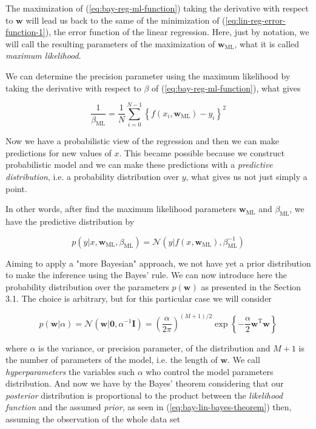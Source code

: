 \documentclass[11pt]{article} %
\begin{document}
The maximization of (\ref{eq:bay-reg-ml-function}) taking the derivative with respect to $\mathbf{w}$ will lead us back to 
the same of the minimization of (\ref{eq:lin-reg-error-function-1}), the error function of the linear regression. Here, just by notation, we will call the resulting parameters of the maximization of $\mathbf{w}_{\text{ML}}$, what it is called \textit{maximum likelihood}.

We can determine the precision parameter using the maximum likelihood by taking the derivative with respect to $\beta$ of (\ref{eq:bay-reg-ml-function}), what gives

\begin{equation}
   \frac{1}{\beta_{\mathrm{ML}}}=\frac{1}{N} \sum_{i=0}^{N-1}\left\{f\left(x_{i}, \mathbf{w}_{\mathrm{ML}}\right)-y_{i}\right\}^{2}
\end{equation}

Now we have a probabilistic view of the regression and then we can make predictions for new values of $x$. This became possible because we construct probabilistic model and we can make these predictions with a \textit{predictive distribution}, i.e. a probability distribution over $y$, what gives us not just simply a point.

In other words, after find the maximum likelihood parameters $\mathbf{w}_\text{ML}$ and $\beta_\text{ML}$, we have the predictive distribution by

\begin{equation}
   p\left(y | x, \mathbf{w}_{\mathrm{ML}}, \beta_{\mathrm{ML}}\right)=\mathcal{N}\left(y | f\left(x, \mathbf{w}_{\mathrm{ML}}\right), \beta_{\mathrm{ML}}^{-1}\right)
\end{equation}

Aiming to apply a "more Bayesian" approach, we not have yet a prior distribution to make the inference using the Bayes' rule. We can now introduce here the probability distribution over the parameters $p(\mathbf{w})$ as presented in the Section 3.1. The choice is arbitrary, but for this particular case we will consider

\begin{equation}
   p(\mathbf{w} | \alpha)=\mathcal{N}\left(\mathbf{w} | \mathbf{0}, \alpha^{-1} \mathbf{I}\right)=\left(\frac{\alpha}{2 \pi}\right)^{(M+1) / 2} \exp \left\{-\frac{\alpha}{2} \mathbf{w}^{\mathrm{T}} \mathbf{w}\right\}
\end{equation}

where $\alpha$ is the variance, or precision parameter, of the distribution and $M+1$ is the number of parameters of the model, i.e. the length of $\mathbf{w}$. We call \textit{hyperparameters} the variables such $\alpha$ who control the model parameters distribution. And now we have by the Bayes' theorem considering that our \textit{posterior} distribution is proportional to the product between the \textit{likelihood function} and the assumed \textit{prior}, as seen in (\ref{eq:bay-lin-bayes-theorem}) then, assuming the observation of the whole data set
\end{document}
